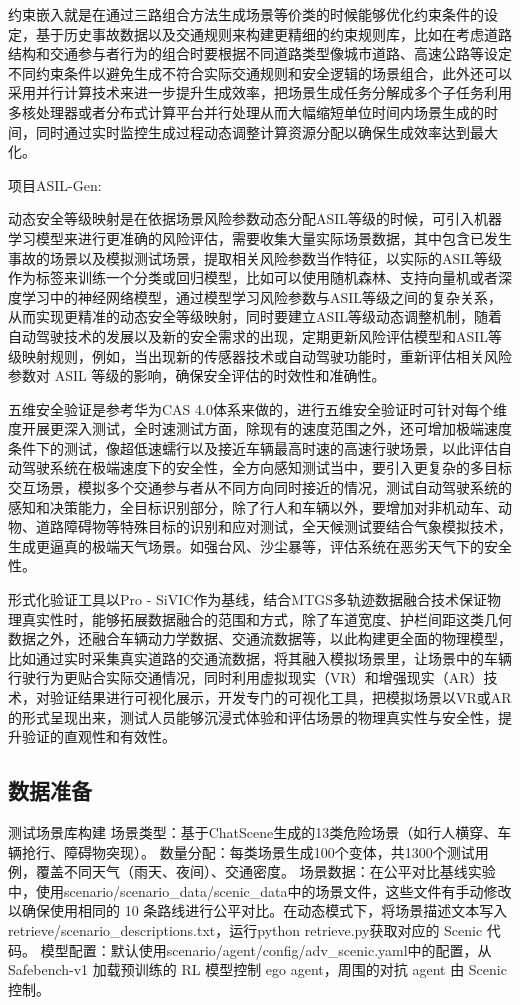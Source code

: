 约束嵌入就是在通过三路组合方法生成场景等价类的时候能够优化约束条件的设定，基于历史事故数据以及交通规则来构建更精细的约束规则库，比如在考虑道路结构和交通参与者行为的组合时要根据不同道路类型像城市道路、高速公路等设定不同约束条件以避免生成不符合实际交通规则和安全逻辑的场景组合，此外还可以采用并行计算技术来进一步提升生成效率，把场景生成任务分解成多个子任务利用多核处理器或者分布式计算平台并行处理从而大幅缩短单位时间内场景生成的时间，同时通过实时监控生成过程动态调整计算资源分配以确保生成效率达到最大化。

项目ASIL-Gen:

动态安全等级映射是在依据场景风险参数动态分配ASIL等级的时候，可引入机器学习模型来进行更准确的风险评估，需要收集大量实际场景数据，其中包含已发生事故的场景以及模拟测试场景，提取相关风险参数当作特征，以实际的ASIL等级作为标签来训练一个分类或回归模型，比如可以使用随机森林、支持向量机或者深度学习中的神经网络模型，通过模型学习风险参数与ASIL等级之间的复杂关系，从而实现更精准的动态安全等级映射，同时要建立ASIL等级动态调整机制，随着自动驾驶技术的发展以及新的安全需求的出现，定期更新风险评估模型和ASIL等级映射规则，例如，当出现新的传感器技术或自动驾驶功能时，重新评估相关风险参数对 ASIL 等级的影响，确保安全评估的时效性和准确性。​


五维安全验证是参考华为CAS 4.0体系来做的，进行五维安全验证时可针对每个维度开展更深入测试，全时速测试方面，除现有的速度范围之外，还可增加极端速度条件下的测试，像超低速蠕行以及接近车辆最高时速的高速行驶场景，以此评估自动驾驶系统在极端速度下的安全性，全方向感知测试当中，要引入更复杂的多目标交互场景，模拟多个交通参与者从不同方向同时接近的情况，测试自动驾驶系统的感知和决策能力，全目标识别部分，除了行人和车辆以外，要增加对非机动车、动物、道路障碍物等特殊目标的识别和应对测试，全天候测试要结合气象模拟技术，生成更逼真的极端天气场景。如强台风、沙尘暴等，评估系统在恶劣天气下的安全性\cite{焦准2006基于证据理论的多传感器信息融合目标识别方法}。​


形式化验证工具以Pro - SiVIC作为基线，结合MTGS多轨迹数据融合技术保证物理真实性时，能够拓展数据融合的范围和方式，除了车道宽度、护栏间距这类几何数据之外，还融合车辆动力学数据、交通流数据等，以此构建更全面的物理模型，比如通过实时采集真实道路的交通流数据，将其融入模拟场景里，让场景中的车辆行驶行为更贴合实际交通情况，同时利用虚拟现实（VR）和增强现实（AR）技术，对验证结果进行可视化展示，开发专门的可视化工具，把模拟场景以VR或AR的形式呈现出来，测试人员能够沉浸式体验和评估场景的物理真实性与安全性，提升验证的直观性和有效性。

\subsection{数据准备}
测试场景库构建
场景类型：基于ChatScene生成的13类危险场景（如行人横穿、车辆抢行、障碍物突现）。
数量分配：每类场景生成100个变体，共1300个测试用例，覆盖不同天气（雨天、夜间）、交通密度。
场景数据：在公平对比基线实验中，使用scenario/scenario\_data/scenic\_data中的场景文件，这些文件有手动修改以确保使用相同的 10 条路线进行公平对比。在动态模式下，将场景描述文本写入retrieve/scenario\_descriptions.txt，运行python retrieve.py获取对应的 Scenic 代码。
模型配置：默认使用scenario/agent/config/adv\_scenic.yaml中的配置，从 Safebench-v1 加载预训练的 RL 模型控制 ego agent，周围的对抗 agent 由 Scenic 控制。

